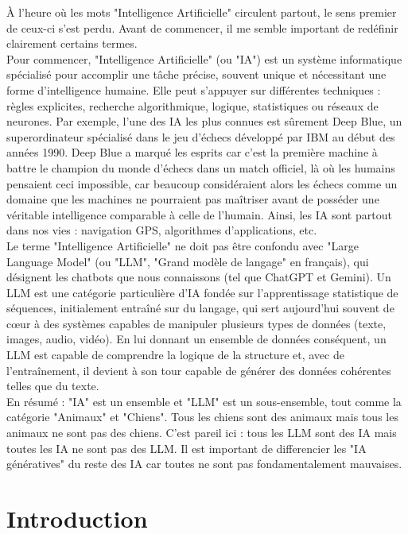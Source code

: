 \documentclass[12pt,a4paper]{article}
\begin{document}
À l'heure où les mots "Intelligence Artificielle" circulent partout, le sens premier de ceux-ci s'est perdu. Avant de commencer, il me semble important de redéfinir clairement certains termes.\\
Pour commencer, "Intelligence Artificielle" (ou "IA") est un système informatique spécialisé pour accomplir une tâche précise, souvent unique et nécessitant une forme d'intelligence humaine. Elle peut s'appuyer sur différentes techniques : règles explicites, recherche algorithmique, logique, statistiques ou réseaux de neurones. Par exemple, l'une des IA les plus connues est sûrement Deep Blue, un superordinateur spécialisé dans le jeu d'échecs développé par IBM au début des années 1990. Deep Blue a marqué les esprits car c'est la première machine à battre le champion du monde d'échecs dans un match officiel, là où les humains pensaient ceci impossible, car beaucoup considéraient alors les échecs comme un domaine que les machines ne pourraient pas maîtriser avant de posséder une véritable intelligence comparable à celle de l'humain. Ainsi, les IA sont partout dans nos vies : navigation GPS, algorithmes d'applications, etc.\\
Le terme "Intelligence Artificielle" ne doit pas être confondu avec "Large Language Model" (ou "LLM", "Grand modèle de langage" en français), qui désignent les chatbots que nous connaissons (tel que ChatGPT et Gemini). Un LLM est une catégorie particulière d'IA fondée sur l'apprentissage statistique de séquences, initialement entraîné sur du langage, qui sert aujourd'hui souvent de cœur à des systèmes capables de manipuler plusieurs types de données (texte, images, audio, vidéo). En lui donnant un ensemble de données conséquent, un LLM est capable de comprendre la logique de la structure et, avec de l'entraînement, il devient à son tour capable de générer des données cohérentes telles que du texte.\\
En résumé : "IA" est un ensemble et "LLM" est un sous-ensemble, tout comme la catégorie "Animaux" et "Chiens". Tous les chiens sont des animaux mais tous les animaux ne sont pas des chiens. C'est pareil ici : tous les LLM sont des IA mais toutes les IA ne sont pas des LLM.
Il est important de differencier les "IA génératives" du reste des IA car toutes ne sont pas fondamentalement mauvaises.

\section{Introduction}
\end{document}
